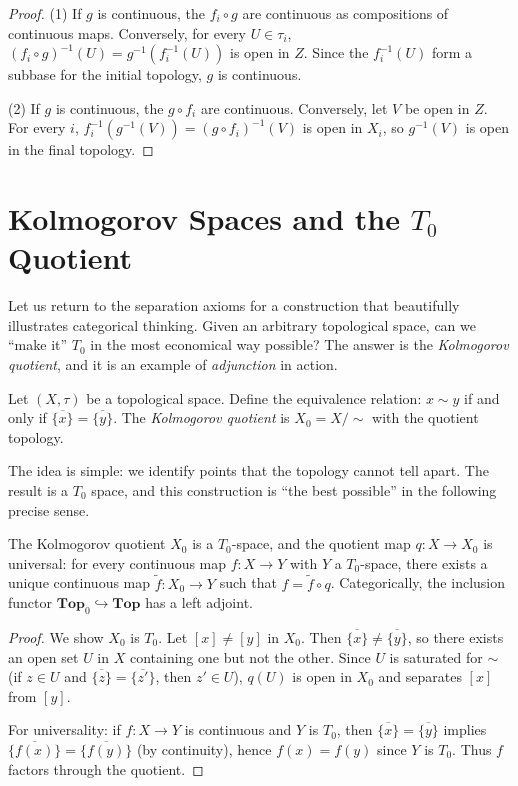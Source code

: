\begin{proof}
(1) If $g$ is continuous, the $f_i \circ g$ are continuous as compositions of continuous
maps. Conversely, for every $U \in \tau_i$, $(f_i \circ g)^{-1}(U) = g^{-1}(f_i^{-1}(U))$
is open in $Z$. Since the $f_i^{-1}(U)$ form a subbase for the initial topology, $g$ is
continuous.

(2) If $g$ is continuous, the $g \circ f_i$ are continuous. Conversely, let $V$ be open in
$Z$. For every $i$, $f_i^{-1}(g^{-1}(V)) = (g \circ f_i)^{-1}(V)$ is open in $X_i$, so
$g^{-1}(V)$ is open in the final topology.
\end{proof}

\section{Kolmogorov Spaces and the $T_0$ Quotient}

Let us return to the separation axioms for a construction that beautifully
illustrates categorical thinking. Given an arbitrary topological space, can
we ``make it'' $T_0$ in the most economical way possible? The answer is the
\emph{Kolmogorov quotient}, and it is an example of \emph{adjunction} in
action.

\begin{definition}
Let $(X,\tau)$ be a topological space. Define the equivalence relation:
$x \sim y$ if and only if $\overline{\{x\}} = \overline{\{y\}}$. The \emph{Kolmogorov
quotient} is $X_0 = X/{\sim}$ with the quotient topology.
\end{definition}

The idea is simple: we identify points that the topology cannot tell apart.
The result is a $T_0$ space, and this construction is ``the best possible''
in the following precise sense.

\begin{theorem}[$T_0$ reflection]
The Kolmogorov quotient $X_0$ is a $T_0$-space, and the quotient map
$q\colon X \to X_0$ is universal: for every continuous map $f\colon X \to Y$ with $Y$ a
$T_0$-space, there exists a unique continuous map $\tilde{f}\colon X_0 \to Y$ such that
$f = \tilde{f} \circ q$. Categorically, the inclusion functor
$\mathbf{Top}_0 \hookrightarrow \mathbf{Top}$ has a left adjoint.
\end{theorem}

\begin{proof}
We show $X_0$ is $T_0$. Let $[x] \neq [y]$ in $X_0$. Then
$\overline{\{x\}} \neq \overline{\{y\}}$, so there exists an open set $U$ in $X$
containing one but not the other. Since $U$ is saturated for $\sim$ (if $z \in U$ and
$\overline{\{z\}} = \overline{\{z'\}}$, then $z' \in U$), $q(U)$ is open in $X_0$ and
separates $[x]$ from $[y]$.

For universality: if $f\colon X \to Y$ is continuous and $Y$ is $T_0$, then
$\overline{\{x\}} = \overline{\{y\}}$ implies $\overline{\{f(x)\}} = \overline{\{f(y)\}}$
(by continuity), hence $f(x) = f(y)$ since $Y$ is $T_0$. Thus $f$ factors through the
quotient.
\end{proof}

